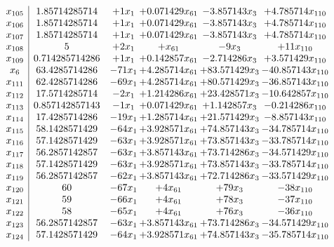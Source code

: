 \documentclass[11pt]{article}
\begin{document}
\[\begin{array}{c| c c@{\hskip 2pt} c@{\hskip 2pt} c@{\hskip 2pt} c@{\hskip 2pt} }
 x_{105}   &  1.85714285714 & + 1 x_{1} & + 0.071429 x_{61} & -3.857143 x_{3} & + 4.785714 x_{110}\\
 x_{106}   &  1.85714285714 & + 1 x_{1} & + 0.071429 x_{61} & -3.857143 x_{3} & + 4.785714 x_{110}\\
 x_{107}   &  1.85714285714 & + 1 x_{1} & + 0.071429 x_{61} & -3.857143 x_{3} & + 4.785714 x_{110}\\
 x_{108}   &  5 & + 2 x_{1} & +  x_{61} & -9 x_{3} & + 11 x_{110}\\
 x_{109}   &  0.714285714286 & + 1 x_{1} & + 0.142857 x_{61} & -2.714286 x_{3} & + 3.571429 x_{110}\\
 x_{6}   &  63.4285714286 & -71 x_{1} & + 4.285714 x_{61} & + 83.571429 x_{3} & -40.857143 x_{110}\\
 x_{111}   &  62.4285714286 & -69 x_{1} & + 4.285714 x_{61} & + 80.571429 x_{3} & -36.857143 x_{110}\\
 x_{112}   &  17.5714285714 & -2 x_{1} & + 1.214286 x_{61} & + 23.428571 x_{3} & -10.642857 x_{110}\\
 x_{113}   &  0.857142857143 & -1 x_{1} & + 0.071429 x_{61} & + 1.142857 x_{3} & -0.214286 x_{110}\\
 x_{114}   &  17.4285714286 & -19 x_{1} & + 1.285714 x_{61} & + 21.571429 x_{3} & -8.857143 x_{110}\\
 x_{115}   &  58.1428571429 & -64 x_{1} & + 3.928571 x_{61} & + 74.857143 x_{3} & -34.785714 x_{110}\\
 x_{116}   &  57.1428571429 & -63 x_{1} & + 3.928571 x_{61} & + 73.857143 x_{3} & -33.785714 x_{110}\\
 x_{117}   &  56.2857142857 & -63 x_{1} & + 3.857143 x_{61} & + 73.714286 x_{3} & -34.571429 x_{110}\\
 x_{118}   &  57.1428571429 & -63 x_{1} & + 3.928571 x_{61} & + 73.857143 x_{3} & -33.785714 x_{110}\\
 x_{119}   &  56.2857142857 & -62 x_{1} & + 3.857143 x_{61} & + 72.714286 x_{3} & -33.571429 x_{110}\\
 x_{120}   &  60 & -67 x_{1} & + 4 x_{61} & + 79 x_{3} & -38 x_{110}\\
 x_{121}   &  59 & -66 x_{1} & + 4 x_{61} & + 78 x_{3} & -37 x_{110}\\
 x_{122}   &  58 & -65 x_{1} & + 4 x_{61} & + 76 x_{3} & -36 x_{110}\\
 x_{123}   &  56.2857142857 & -63 x_{1} & + 3.857143 x_{61} & + 73.714286 x_{3} & -34.571429 x_{110}\\
 x_{124}   &  57.1428571429 & -64 x_{1} & + 3.928571 x_{61} & + 74.857143 x_{3} & -35.785714 x_{110}\\

\end{array}\]
\end{document}
